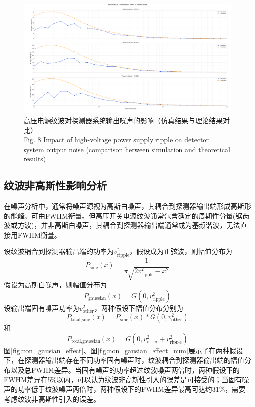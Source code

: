 \documentclass{ctexart}
\begin{document}
\begin{figure}[!h]
    \centering
    \includegraphics[width=\linewidth]{./circ_sim_result.png}
    \caption{高压电源纹波对探测器系统输出噪声的影响（仿真结果与理论结果对比） \\ Fig. 8 Impact of high-voltage power supply ripple on detector system output noise (comparison between simulation and theoretical results)}
    \label{fig:circ_sim_result}
\end{figure}

\subsection{纹波非高斯性影响分析}

在噪声分析中，通常将噪声源视为高斯白噪声\cite{13}，其耦合到探测器输出端形成高斯形的能峰，可由FWHM衡量。但高压开关电源纹波通常包含确定的周期性分量(锯齿波或方波)，并非高斯白噪声，其耦合到探测器输出端通常成为基频谐波，无法直接用FWHM衡量。

设纹波耦合到探测器输出端的功率为$v_\text{ripple}^2$，假设成为正弦波，则幅值分布为
\begin{equation*}
P_\text{sine}(x)=\frac{1}{\pi\sqrt{2v_\text{ripple}^2-x^2}}
\end{equation*}
假设为高斯白噪声，则幅值分布为
\begin{equation*}
P_\text{gaussian}(x)=G(0, v_\text{ripple}^2)
\end{equation*}
设输出端固有噪声功率为$v_\text{other}^2$，两种假设下幅值分布分别为
\begin{equation*}
P_\text{total,sine}(x)=P_\text{sine}(x)*G(0, v_\text{other}^2)
\end{equation*}
和
\begin{equation*}
P_\text{total,gaussian}(x)=G(0, v_\text{other}^2+v_\text{ripple}^2)
\end{equation*}
图\ref{fig:non_gausian_effect}、图\ref{fig:non_gausian_effect_num}展示了在两种假设下，在探测器输出端存在不同功率固有噪声时，纹波耦合到探测器输出端的幅值分布以及总FWHM差异。当固有噪声的功率超过纹波噪声两倍时，两种假设下的FWHM差异在5\%以内，可以认为纹波非高斯性引入的误差是可接受的；当固有噪声的功率低于纹波噪声两倍时，两种假设下的FWHM差异最高可达约31\%，需要考虑纹波非高斯性引入的误差。
\end{document}
